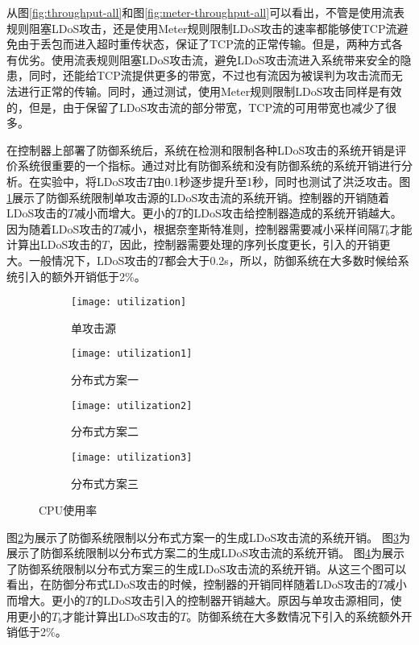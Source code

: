 从图\ref{fig:throughput-all}和图\ref{fig:meter-throughput-all}可以看出，不管是使用流表规则阻塞LDoS攻击，还是使用Meter规则限制LDoS攻击的速率都能够使TCP流避免由于丢包而进入超时重传状态，保证了TCP流的正常传输。但是，两种方式各有优劣。使用流表规则阻塞LDoS攻击流，避免LDoS攻击流进入系统带来安全的隐患，同时，还能给TCP流提供更多的带宽，不过也有流因为被误判为攻击流而无法进行正常的传输。同时，通过测试，使用Meter规则限制LDoS攻击同样是有效的，但是，由于保留了LDoS攻击流的部分带宽，TCP流的可用带宽也减少了很多。

在控制器上部署了防御系统后，系统在检测和限制各种LDoS攻击的系统开销是评价系统很重要的一个指标。通过对比有防御系统和没有防御系统的系统开销进行分析。在实验中，将LDoS攻击$T$由0.1秒逐步提升至1秒，同时也测试了洪泛攻击。图\ref{fig:CPU-single}展示了防御系统限制单攻击源的LDoS攻击流的系统开销。控制器的开销随着LDoS攻击的$T$减小而增大。更小的$T$的LDoS攻击给控制器造成的系统开销越大。因为随着LDoS攻击的$T$减小，根据奈奎斯特准则，控制器需要减小采样间隔$T_b$才能计算出LDoS攻击的$T$，因此，控制器需要处理的序列长度更长，引入的开销更大。一般情况下，LDoS攻击的$T$都会大于0.2s，所以，防御系统在大多数时候给系统引入的额外开销低于2\%。

\begin{figure}
    \begin{subfigure}{.49\textwidth}
        \centering
        \texttt{[image: utilization]}
        \caption{单攻击源}
        \label{fig:CPU-single}
    \end{subfigure}
    \begin{subfigure}{.49\textwidth}
        \centering
        \texttt{[image: utilization1]}
        \caption{分布式方案一}
        \label{fig:CPU-2h-mod1}
    \end{subfigure}

    \begin{subfigure}{.49\textwidth}
        \centering
        \texttt{[image: utilization2]}
        \caption{分布式方案二}
        \label{fig:CPU-2h-mod2}
    \end{subfigure}
    \begin{subfigure}{.49\textwidth}
        \centering
        \texttt{[image: utilization3]}
        \caption{分布式方案三}
        \label{fig:CPU-2h-mod3}
    \end{subfigure}


    \caption{CPU使用率}
    \label{fig:CPU-all}
\end{figure}

图\ref{fig:CPU-2h-mod1}为展示了防御系统限制以分布式方案一的生成LDoS攻击流的系统开销。
图\ref{fig:CPU-2h-mod2}为展示了防御系统限制以分布式方案二的生成LDoS攻击流的系统开销。
图\ref{fig:CPU-2h-mod3}为展示了防御系统限制以分布式方案三的生成LDoS攻击流的系统开销。从这三个图可以看出，在防御分布式LDoS攻击的时候，控制器的开销同样随着LDoS攻击的$T$减小而增大。更小的$T$的LDoS攻击引入的控制器开销越大。原因与单攻击源相同，使用更小的$T_b$才能计算出LDoS攻击的$T$。防御系统在大多数情况下引入的系统额外开销低于2\%。

